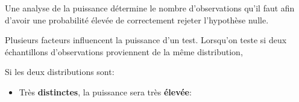 \documentclass[10pt, french]{article}
\begin{document}
\begin{multicols*}{2}
\begin{definitionNOHFILL}
\tcbline

Une analyse de la puissance détermine le nombre d'observations qu'il faut afin d'avoir une probabilité élevée de correctement rejeter l'hypothèse nulle.
\end{definitionNOHFILL}


Plusieurs facteurs influencent la puissance d'un test. Lorsqu'on teste si deux échantillons d'observations proviennent de la même distribution,
\begin{definitionNOHFILLsub}
Si les deux distributions sont:
\begin{itemize}
	\item	Très \textbf{distinctes}, la puissance sera très \textbf{élevée}:
		\begin{center}

\begin{tikzpicture}[x=0.75pt,y=0.75pt,yscale=-1,xscale=1]


\end{tikzpicture}
\end{center}
\end{itemize}
\end{definitionNOHFILLsub}
\end{multicols*}
\end{document}
